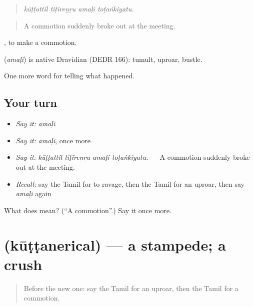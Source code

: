 \begin{quote}
\emph{kūṭṭattil tiṭīreṉṟu amaḷi toṭaṅkiyatu.}
\end{quote}

\begin{quote}
A commotion suddenly broke out at the meeting.
\end{quote}

 , to make a commotion.

\begin{cousinweb}
\textbf{} (\emph{amaḷi}) is native Dravidian (DEDR 166): tumult, uproar, bustle.
\end{cousinweb}

\begin{grammarlens}[title={What you've built}]
One more word for telling what happened.
\end{grammarlens}

\subsection*{Your turn}
\begin{itemize}
\raggedright
  \item \emph{Say it:} \emph{amaḷi}
  \item \emph{Say it:} \emph{amaḷi}, once more
  \item \emph{Say it:} \emph{kūṭṭattil tiṭīreṉṟu amaḷi toṭaṅkiyatu.} — A commotion suddenly broke out at the meeting.
  \item \emph{Recall:} say the Tamil for to ravage, then the Tamil for an uproar, then say \emph{amaḷi} again
\end{itemize}

\begin{tcolorbox}[breakable,colback=teal!4,colframe=teal!35!black,title={Before you move on}]
What does  mean? (\textquotedblleft{}A commotion\textquotedblright{}.) Say it once more.
\end{tcolorbox}
\section[\texorpdfstring{\ta{கூட்டநெரிசல்} (kūṭṭanerical)}{கூட்டநெரிசல் (kūṭṭanerical)}]{ (kūṭṭanerical) — a stampede; a crush}

\label{lesson:TA-C303-kuttanerical}



\begin{quote}
Before the new one: say the Tamil for an uproar, then the Tamil for a commotion.
\end{quote}


